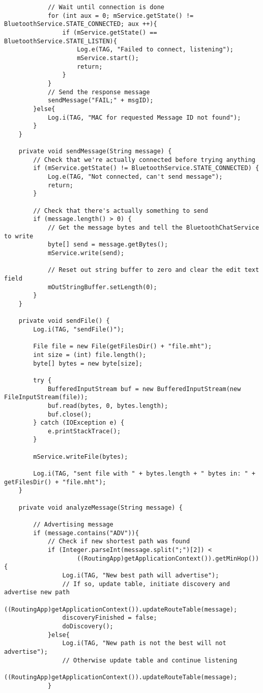 \begin{verbatim}
            // Wait until connection is done
            for (int aux = 0; mService.getState() != BluetoothService.STATE_CONNECTED; aux ++){
                if (mService.getState() == BluetoothService.STATE_LISTEN){
                    Log.e(TAG, "Failed to connect, listening");
                    mService.start();
                    return;
                }
            }
            // Send the response message
            sendMessage("FAIL;" + msgID);
        }else{
            Log.i(TAG, "MAC for requested Message ID not found");
        }
    }

    private void sendMessage(String message) {
        // Check that we're actually connected before trying anything
        if (mService.getState() != BluetoothService.STATE_CONNECTED) {
            Log.e(TAG, "Not connected, can't send message");
            return;
        }

        // Check that there's actually something to send
        if (message.length() > 0) {
            // Get the message bytes and tell the BluetoothChatService to write
            byte[] send = message.getBytes();
            mService.write(send);

            // Reset out string buffer to zero and clear the edit text field
            mOutStringBuffer.setLength(0);
        }
    }

    private void sendFile() {
        Log.i(TAG, "sendFile()");

        File file = new File(getFilesDir() + "file.mht");
        int size = (int) file.length();
        byte[] bytes = new byte[size];

        try {
            BufferedInputStream buf = new BufferedInputStream(new FileInputStream(file));
            buf.read(bytes, 0, bytes.length);
            buf.close();
        } catch (IOException e) {
            e.printStackTrace();
        }

        mService.writeFile(bytes);

        Log.i(TAG, "sent file with " + bytes.length + " bytes in: " + getFilesDir() + "file.mht");
    }

    private void analyzeMessage(String message) {

        // Advertising message
        if (message.contains("ADV")){
            // Check if new shortest path was found
            if (Integer.parseInt(message.split(";")[2]) <
                    ((RoutingApp)getApplicationContext()).getMinHop()){
                Log.i(TAG, "New best path will advertise");
                // If so, update table, initiate discovery and advertise new path
                ((RoutingApp)getApplicationContext()).updateRouteTable(message);
                discoveryFinished = false;
                doDiscovery();
            }else{
                Log.i(TAG, "New path is not the best will not advertise");
                // Otherwise update table and continue listening
                ((RoutingApp)getApplicationContext()).updateRouteTable(message);
            }


\end{verbatim}
